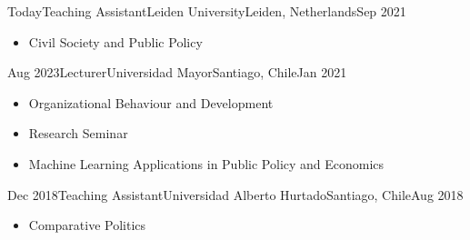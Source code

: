 





\begin{experiences}
  \experience
    {Today}{Teaching Assistant}{Leiden University}{Leiden, Netherlands}{Sep 2021}
    {\begin{itemize}
    \item Civil Society and Public Policy
    \end{itemize}}
    {}
\end{experiences}
\vspace{-2mm}

\begin{experiences}
  \experience
    {Aug 2023}{Lecturer}{Universidad Mayor}{Santiago, Chile}{Jan 2021}
    {\begin{itemize}
    \item Organizational Behaviour and Development
    \item Research Seminar
    \item Machine Learning Applications in Public Policy and Economics
    \end{itemize}}
    {}
\end{experiences}
\vspace{-2mm}

\begin{experiences}
  \experience
    {Dec 2018}{Teaching Assistant}{Universidad Alberto Hurtado}{Santiago, Chile}{Aug 2018}
    {\begin{itemize}
    \item Comparative Politics
    \end{itemize}}
    {}
\end{experiences}
\vspace{-2mm}


